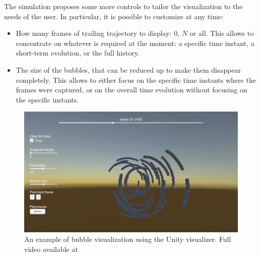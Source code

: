 The simulation proposes some more controls to tailor the visualization to the needs of the user.
In particular, it is possible to customize at any time:
\begin{itemize}
	\itemsep 0em
	\item How many frames of trailing trajectory to display: 0, $N$ or all. This allows to concentrate on whatever is required at the moment: a specific time instant, a short-term evolution, or the full history.
	\item The size of the bubbles, that can be reduced up to make them disappear completely. This allows to either focus on the specific time instants where the frames were captured, or on the overall time evolution without focusing on the specific instants.
\end{itemize}

\begin{figure}[H]
	\centerline{\includegraphics[width=\locateimgsize]{images/visual/unity.png}}
	\caption{\centering An example of bubble visualization using the Unity visualizer. Full video available at~\cite{visual-unity}}
	\label{fig:visual:unity}
\end{figure}

